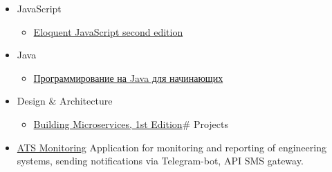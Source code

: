 \documentclass{article}
\begin{document}
\begin{itemize}
\item JavaScript\begin{itemize}
\item \href{https://eloquentjavascript.net/2nd_edition/}{Eloquent JavaScript second edition}
\end{itemize}

\item Java\begin{itemize}
\item \href{https://www.ozon.ru/product/programmirovanie-na-java-dlya-nachinayushchih-136029645/?sh=BtQngoz1wQ}{Программирование на Java для начинающих}
\end{itemize}

\item Design \& Architecture\begin{itemize}
\item \href{https://samnewman.io/books/building_microservices/}{Building Microservices, 1st Edition}\# Projects
\end{itemize}

\item \href{https://github.com/stepanov-denis/ats-monitoring}{ATS Monitoring}
Application for monitoring and reporting of engineering systems, sending notifications via Telegram-bot, API SMS gateway.
\end{itemize}
\end{document}
